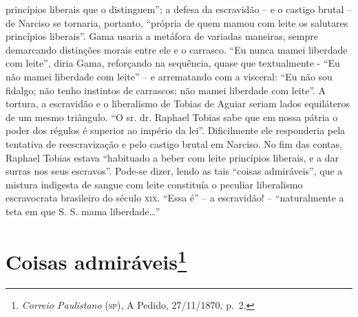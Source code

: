 {\begin{argumento}
{princípios liberais que o distinguem''; a defesa da escravidão -- e o
castigo brutal -- de Narciso se tornaria, portanto, ``própria de quem
mamou com leite os salutares princípios liberais''. Gama usaria a
metáfora de variadas maneiras, sempre demarcando distinções morais entre
ele e o carrasco. ``Eu nunca mamei liberdade com leite'', diria Gama,
reforçando na sequência, quase que textualmente - ``Eu não mamei
liberdade com leite'' -- e arrematando com a visceral: ``Eu não sou
fidalgo; não tenho instintos de carrascos; não mamei liberdade com
leite''. A tortura, a escravidão e o liberalismo de Tobias de Aguiar
seriam lados equiláteros de um mesmo triângulo. ``O sr. dr. Raphael
Tobias sabe que em nossa pátria o poder dos régulos é superior ao
império da lei''. Dificilmente ele responderia pela tentativa de
reescravização e pelo castigo brutal em Narciso. No fim das contas,
Raphael Tobias estava ``habituado a beber com leite princípios liberais,
e a dar surras nos seus escravos''. Pode-se dizer, lendo as tais ``coisas
admiráveis'', que a mistura indigesta de sangue com leite constituía o
peculiar liberalismo escravocrata brasileiro do século \textsc{xix}. ``Essa é'' --
a escravidão! -- ``naturalmente a teta em que S. S. mama liberdade\ldots{}''}
\end{argumento}

\chapter{Coisas admiráveis\footnote{\emph{Correio Paulistano} (\textsc{sp}), A Pedido, 27/11/1870,
  p.~2.}} %

}
